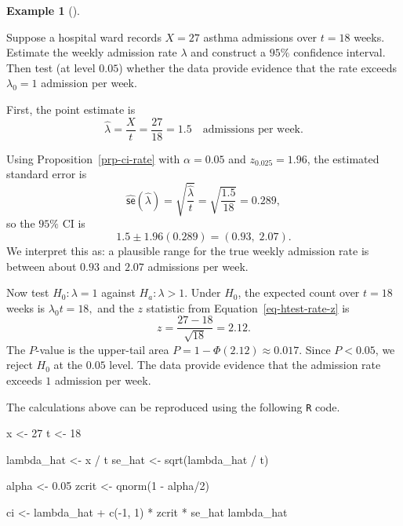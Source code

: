 \documentclass[
  a4paper,
  DIV=11,
  numbers=noendperiod,
  oneside]{scrreprt}
\newenvironment{Shaded}{\begin{snugshade}}{\end{snugshade}}
\newcommand{\DecValTok}[1]{\textcolor[rgb]{0.68,0.00,0.00}{#1}}
\newcommand{\FloatTok}[1]{\textcolor[rgb]{0.68,0.00,0.00}{#1}}
\newcommand{\FunctionTok}[1]{\textcolor[rgb]{0.28,0.35,0.67}{#1}}
\newcommand{\NormalTok}[1]{\textcolor[rgb]{0.00,0.23,0.31}{#1}}
\newcommand{\OtherTok}[1]{\textcolor[rgb]{0.00,0.23,0.31}{#1}}
\newcommand{\SpecialCharTok}[1]{\textcolor[rgb]{0.37,0.37,0.37}{#1}}
\theoremstyle{plain}
\theoremstyle{definition}
\newtheorem{example}{Example}[chapter]
\theoremstyle{definition}
\theoremstyle{definition}
\theoremstyle{plain}
\theoremstyle{remark}
\begin{document}
\begin{example}[]\protect\hypertarget{exm-estimating-rate}{}\label{exm-estimating-rate}

Suppose a hospital ward records \(X=27\) asthma admissions over \(t=18\)
weeks. Estimate the weekly admission rate \(\lambda\) and construct a
\(95\%\) confidence interval. Then test (at level \(0.05\)) whether the
data provide evidence that the rate exceeds \(\lambda_0=1\) admission
per week.

First, the point estimate is \[
\widehat{\lambda} = \frac{X}{t} = \frac{27}{18} = 1.5 \quad \text{admissions per week.}
\]

Using Proposition~\ref{prp-ci-rate} with \(\alpha=0.05\) and
\(z_{0.025}=1.96\), the estimated standard error is \[
\widehat{\mathsf{se}}(\widehat{\lambda}) = \sqrt{\frac{\widehat{\lambda}}{t}}
= \sqrt{\frac{1.5}{18}}
= 0.289,
\] so the \(95\%\) CI is \[
1.5 \pm 1.96(0.289)
= (0.93,\; 2.07).
\] We interpret this as: a plausible range for the true weekly admission
rate is between about \(0.93\) and \(2.07\) admissions per week.

Now test \(H_0:\lambda=1\) against \(H_a:\lambda>1.\) Under \(H_0\), the
expected count over \(t=18\) weeks is \(\lambda_0 t = 18,\) and the
\(z\) statistic from Equation~\ref{eq-htest-rate-z} is \[
z = \frac{27-18}{\sqrt{18}} = 2.12.
\] The \(P\)-value is the upper-tail area
\(P = 1-\Phi(2.12) \approx 0.017.\) Since \(P<0.05\), we reject \(H_0\)
at the \(0.05\) level. The data provide evidence that the admission rate
exceeds \(1\) admission per week.

\end{example}

The calculations above can be reproduced using the following \texttt{R}
code.

\begin{Shaded}
\begin{Highlighting}[]
\NormalTok{x }\OtherTok{\textless{}{-}} \DecValTok{27}
\NormalTok{t }\OtherTok{\textless{}{-}} \DecValTok{18}

\NormalTok{lambda\_hat }\OtherTok{\textless{}{-}}\NormalTok{ x }\SpecialCharTok{/}\NormalTok{ t}
\NormalTok{se\_hat }\OtherTok{\textless{}{-}} \FunctionTok{sqrt}\NormalTok{(lambda\_hat }\SpecialCharTok{/}\NormalTok{ t)}

\NormalTok{alpha }\OtherTok{\textless{}{-}} \FloatTok{0.05}
\NormalTok{zcrit }\OtherTok{\textless{}{-}} \FunctionTok{qnorm}\NormalTok{(}\DecValTok{1} \SpecialCharTok{{-}}\NormalTok{ alpha}\SpecialCharTok{/}\DecValTok{2}\NormalTok{)}

\NormalTok{ci }\OtherTok{\textless{}{-}}\NormalTok{ lambda\_hat }\SpecialCharTok{+} \FunctionTok{c}\NormalTok{(}\SpecialCharTok{{-}}\DecValTok{1}\NormalTok{, }\DecValTok{1}\NormalTok{) }\SpecialCharTok{*}\NormalTok{ zcrit }\SpecialCharTok{*}\NormalTok{ se\_hat}
\NormalTok{lambda\_hat}
\end{Highlighting}
\end{Shaded}
\end{document}
